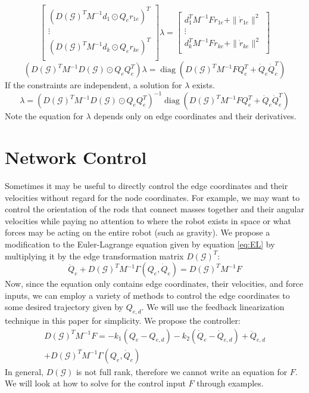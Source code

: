 \documentclass[conference]{IEEEtran}
\DeclareMathOperator{\diag}{diag}
\begin{document}
$$\begin{bmatrix}
    \left(D(\mathcal{G})^TM^{-1}d_1\odot Q_er_{1e}\right)^T\\
    \vdots\\
    \left(D(\mathcal{G})^TM^{-1}d_k\odot Q_er_{ke}\right)^T\\
\end{bmatrix}\lambda=\begin{bmatrix}
    d_1^TM^{-1}Fr_{1e}+\|\dot{r}_{1e}\|^2\\
    \vdots\\
    d_k^TM^{-1}Fr_{ke}+\|\dot{r}_{ke}\|^2\\
\end{bmatrix}$$
$$\left(D(\mathcal{G})^TM^{-1}D(\mathcal{G})\odot Q_eQ_e^T\right)\lambda=\diag\left(D(\mathcal{G})^TM^{-1}FQ_e^T+\dot{Q}_e\dot{Q}_e^T\right)$$
If the constraints are independent, a solution for $\lambda$ exists.
\begin{equation} \label{eq:lambda}
    \lambda=\left(D(\mathcal{G})^TM^{-1}D(\mathcal{G})\odot Q_eQ_e^T\right)^{-1}\diag\left(D(\mathcal{G})^TM^{-1}FQ_e^T+\dot{Q}_e\dot{Q}_e^T\right)
\end{equation}
Note the equation for $\lambda$ depends only on edge coordinates and their derivatives.

\section{Network Control}
Sometimes it may be useful to directly control the edge coordinates and their velocities without regard for the node coordinates. For example, we may want to control the orientation of the rods that connect masses together and their angular velocities while paying no attention to where the robot exists in space or what forces may be acting on the entire robot (such as gravity). We propose a modification to the Euler-Lagrange equation given by equation \ref{eq:EL} by multiplying it by the edge transformation matrix $D(\mathcal{G})^T$:
$$\ddot{Q}_e+D(\mathcal{G})^TM^{-1}\Gamma(Q_e,\dot{Q}_e)=D(\mathcal{G})^TM^{-1}F$$
Now, since the equation only contains edge coordinates, their velocities, and force inputs, we can employ a variety of methods to control the edge coordinates to some desired trajectory given by $Q_{e,d}$. We will use the feedback linearization technique in this paper for simplicity. We propose the controller:
\begin{multline} \label{eq:controller}
    D(\mathcal{G})^TM^{-1}F=-k_1(Q_e-Q_{e,d})-k_2(\dot{Q}_e-\dot{Q}_{e,d})+\ddot{Q}_{e,d}\\
    +D(\mathcal{G})^TM^{-1}\Gamma(Q_e, \dot{Q}_e)
\end{multline}
In general, $D(\mathcal{G})$ is not full rank, therefore we cannot write an equation for $F$. We will look at how to solve for the control input $F$ through examples.
\end{document}
